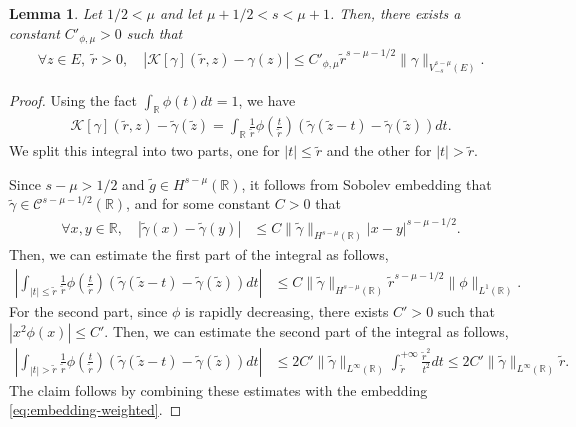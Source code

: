 ﻿\documentclass[11pt,reqno,oneside]{amsart}
\newtheorem{lemma}[theorem]{Lemma}
\theoremstyle{definition}
\theoremstyle{remark}
\newcommand{\R}{\mathbb{R}}
\newcommand{\Cont}{\mathcal{C}}
\newcommand{\g}{\gamma}
\newcommand{\ds}{\displaystyle}
\begin{document}
        \begin{lemma}\label{lemma:K-gamma}
            Let $1/2<\mu$ and let $\mu+1/2<s<\mu+1$. Then, there exists a constant $C'_{\phi,\mu}>0$ such that
            \begin{align*}
               \forall z\in E,\; \widetilde{r}>0,\quad |\mathcal{K}[\g](\widetilde{r},z)-\g(z)|\leq C'_{\phi,\mu} \widetilde{r}^{s-\mu-1/2}\|\g\|_{V_{-s}^{s-\mu}(E)}.
            \end{align*}
        \end{lemma}
        \begin{proof}
            Using the fact $\ds \int_\R \phi(t)dt=1$, we have 
            \begin{align*}
                \mathcal{K}[\g](\widetilde{r},z)-\widetilde{\g}(\widetilde{z})=\int_\R \frac{1}{\widetilde{r}} \phi(\frac{t}{\widetilde{r}})(\widetilde{\g}(\widetilde{z}-t)-\widetilde{\g}(\widetilde{z})) dt.
            \end{align*}
            We split this integral into two parts, one for $|t|\leq \widetilde{r}$ and the other for $|t|>\widetilde{r}$.

            Since $s-\mu>1/2$ and $\widetilde{g}\in H^{s-\mu}(\R)$, it follows from Sobolev embedding that $\widetilde{\g}\in \Cont^{s-\mu-1/2}(\R)$, and for some constant $C>0$ that
            \begin{align*}
                    \forall x,y\in\R,\quad |\widetilde{\g}(x)-\widetilde{\g}(y)| &\leq C \|\widetilde{\g}\|_{H^{s-\mu}(\R)}|x-y|^{s-\mu-1/2}.
            \end{align*}
            Then, we can estimate the first part of the integral as follows,
            \begin{align*}
                \left|\int_{|t|\leq \widetilde{r}} \frac{1}{\widetilde{r}} \phi\left(\frac{t}{\widetilde{r}}\right) (\widetilde{\g}(\widetilde{z}-t)-\widetilde{\g}(\widetilde{z})) dt \right| &\leq C\|\widetilde{\g}\|_{H^{s-\mu}(\R)}\widetilde{r}^{s-\mu-1/2}\|\phi\|_{L^1(\R)}.
            \end{align*}
            For the second part, since $\phi$ is rapidly decreasing, there exists $C'>0$ such that $\ds |x^2\phi(x)| \leq C'$. Then, we can estimate the second part of the integral as follows,
            \begin{align*}
                \left|\int_{|t|>\widetilde{r}} \frac{1}{\widetilde{r}} \phi\left(\frac{t}{\widetilde{r}}\right) (\widetilde{\g}(\widetilde{z}-t)-\widetilde{\g}(\widetilde{z})) dt \right| &\leq 2C'\|\widetilde{\g}\|_{L^\infty(\R)}\int_{\widetilde{r}}^{+\infty} \frac{\widetilde{r}^2}{t^2} dt \leq 2C'\|\widetilde{\g}\|_{L^\infty(\R)}\widetilde{r}.
            \end{align*}
            The claim follows by combining these estimates with the embedding \eqref{eq:embedding-weighted}.
        \end{proof}

    
    
    
\end{document}
